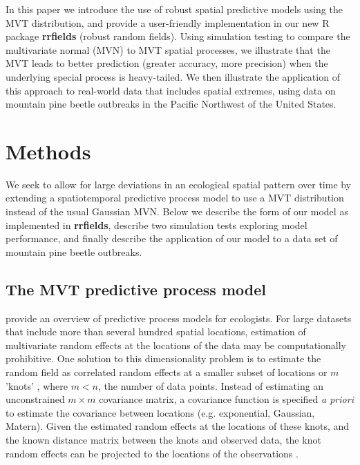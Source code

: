 \documentclass[12pt,english]{article}
\begin{document}
\begin{spacing}{1.3}
In this paper we introduce the use of robust spatial predictive models using
the MVT distribution, and provide a user-friendly implementation in our new R
package \textbf{rrfields} (robust random fields). Using simulation testing to
compare the multivariate normal (MVN) to MVT spatial processes, we illustrate
that the MVT leads to better prediction (greater accuracy, more precision)
when the underlying special process is heavy-tailed. We then illustrate the
application of this approach to real-world data that includes spatial
extremes, using data on mountain pine beetle outbreaks in the Pacific
Northwest of the United States.

\section{Methods}

We seek to allow for large deviations in an ecological spatial pattern over
time by extending a spatiotemporal predictive process model to use a MVT
distribution instead of the usual Gaussian MVN. Below we describe the form of
our model as implemented in \textbf{rrfields}, describe two simulation tests
exploring model performance, and finally describe the application of our model
to a data set of mountain pine beetle outbreaks.

\subsection{The MVT predictive process model}

\citet{latimer2009} provide an overview of predictive process models for
ecologists. For large datasets that include more than several hundred spatial
locations, estimation of multivariate random effects at the locations of the
data may be computationally prohibitive. One solution to this dimensionality
problem is to estimate the random field as correlated random effects at a
smaller subset of locations or $m$ 'knots' \citep[e.g.][]{latimer2009,
  shelton2014}, where $m < n$, the number of data points. Instead of
estimating an unconstrained $m \times m$ covariance matrix, a covariance
function is specified \emph{a priori} to estimate the covariance between
locations (e.g. exponential, Gaussian, Matern). Given the estimated random
effects at the locations of these knots, and the known distance matrix between
the knots and observed data, the knot random effects can be projected to the
locations of the observations \citep[][Figure~\ref{fig:didactic}]{latimer2009,
  finley2009}.


\end{spacing}
\end{document}
